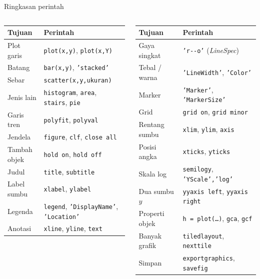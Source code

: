 \documentclass[10pt,aspectratio=169]{beamer}
\newcommand{\kd}[1]{\texttt{#1}}
\begin{document}
\begin{frame}{Ringkasan perintah}
\scriptsize
\begin{columns}[T,onlytextwidth]
\begin{tabular}{@{}ll@{}}
\toprule
Tujuan & Perintah\\
\midrule
Plot garis   & \kd{plot(x,y)}, \kd{plot(x,Y)}\\
Batang       & \kd{bar(x,y)}, \kd{'stacked'}\\
Sebar        & \kd{scatter(x,y,ukuran)}\\
Jenis lain   & \kd{histogram}, \kd{area}, \kd{stairs}, \kd{pie}\\
Garis tren   & \kd{polyfit}, \kd{polyval}\\
Jendela      & \kd{figure}, \kd{clf}, \kd{close all}\\
Tambah objek & \kd{hold on}, \kd{hold off}\\
Judul        & \kd{title}, \kd{subtitle}\\
Label sumbu  & \kd{xlabel}, \kd{ylabel}\\
Legenda      & \kd{legend}, \kd{'DisplayName'}, \kd{'Location'}\\
Anotasi      & \kd{xline}, \kd{yline}, \kd{text}\\
\bottomrule
\end{tabular}
\begin{tabular}{@{}ll@{}}
\toprule
Tujuan & Perintah\\
\midrule
Gaya singkat   & \kd{'r-{}-o'} (\emph{LineSpec})\\
Tebal / warna  & \kd{'LineWidth'}, \kd{'Color'}\\
Marker         & \kd{'Marker'}, \kd{'MarkerSize'}\\
Grid           & \kd{grid on}, \kd{grid minor}\\
Rentang sumbu  & \kd{xlim}, \kd{ylim}, \kd{axis}\\
Posisi angka   & \kd{xticks}, \kd{yticks}\\
Skala log      & \kd{semilogy}, \kd{'YScale','log'}\\
Dua sumbu $y$  & \kd{yyaxis left}, \kd{yyaxis right}\\
Properti objek & \kd{h = plot(\ldots)}, \kd{gca}, \kd{gcf}\\
Banyak grafik  & \kd{tiledlayout}, \kd{nexttile}\\
Simpan         & \kd{exportgraphics}, \kd{savefig}\\
\bottomrule
\end{tabular}
\end{columns}
\end{frame}
\end{document}
